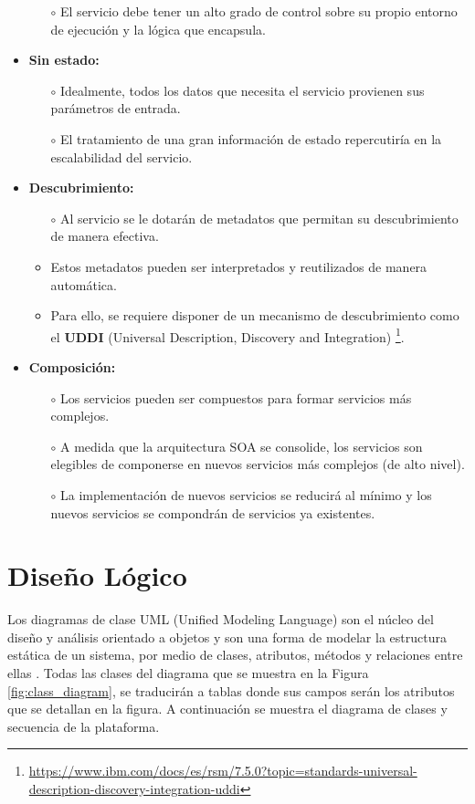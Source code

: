\begin{itemize}
\begin{itemize}
        \item [$\circ$] El servicio debe tener un alto grado de control sobre su propio entorno de ejecución y la lógica que encapsula.
    \end{itemize}
    \item \textbf{Sin estado:}
    \begin{itemize}
        \item [$\circ$] Idealmente, todos los datos que necesita el servicio provienen sus parámetros de entrada.
        \item [$\circ$] El tratamiento de una gran información de estado repercutiría en la escalabilidad del servicio.
    \end{itemize}
    \item \textbf{Descubrimiento:}
    \begin{itemize}
        \item [$\circ$] Al servicio se le dotarán de metadatos que permitan su descubrimiento de manera efectiva.
        \item Estos metadatos pueden ser interpretados y reutilizados de manera automática.
        \item Para ello, se requiere disponer de un mecanismo de descubrimiento como el \textbf{UDDI} (Universal Description, Discovery and Integration) \footnote{\url{https://www.ibm.com/docs/es/rsm/7.5.0?topic=standards-universal-description-discovery-integration-uddi}}.
    \end{itemize}
    \item \textbf{Composición:}
    \begin{itemize}
        \item [$\circ$] Los servicios pueden ser compuestos para formar servicios más complejos.
        \item [$\circ$] A medida que la arquitectura SOA se consolide, los servicios son elegibles de componerse en nuevos servicios más complejos (de alto nivel).
        \item [$\circ$]La implementación de nuevos servicios se reducirá al mínimo y los nuevos servicios se compondrán de servicios ya existentes.
    \end{itemize}
\end{itemize}

\section{Diseño Lógico}

Los diagramas de clase UML (Unified Modeling Language) son el núcleo del diseño y análisis orientado a objetos y son una forma de modelar la estructura estática de un sistema, por medio de clases, atributos, métodos y relaciones entre ellas \cite{herchi2012user}. Todas las clases del diagrama que se muestra en la Figura \ref{fig:class_diagram}, se traducirán a tablas donde sus campos serán los atributos que se detallan en la figura. A continuación se muestra el diagrama de clases y secuencia de la plataforma.\newline

